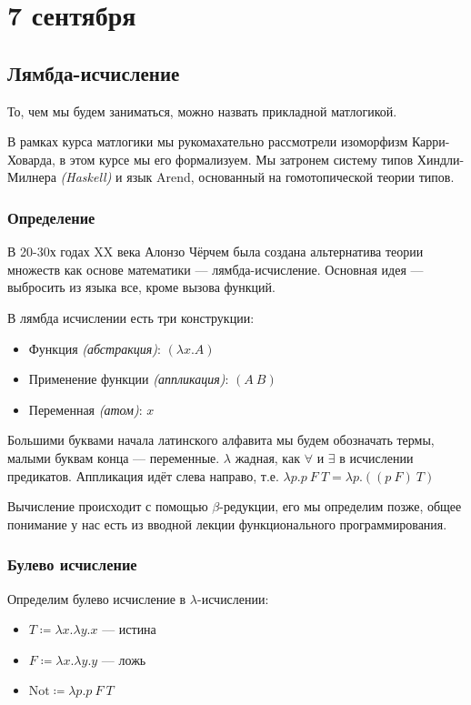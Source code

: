 \chapter{7 сентября}

\section{Лямбда-исчисление}

То, чем мы будем заниматься, можно назвать прикладной матлогикой.

В рамках курса матлогики мы рукомахательно рассмотрели изоморфизм Карри-Ховарда, в этом курсе мы его формализуем. Мы затронем систему типов Хиндли-Милнера \textit{(Haskell)} и язык Arend, основанный на гомотопической теории типов.

\subsection{Определение}

В 20-30х годах XX века Алонзо Чёрчем была создана альтернатива теории множеств как основе математики --- лямбда-исчисление. Основная идея --- выбросить из языка все, кроме вызова функций.

В лямбда исчислении есть три конструкции:
\begin{itemize}
    \item Функция \textit{(абстракция)}: \((\lambda x.A)\)
    \item Применение функции \textit{(аппликация)}: \((A\ B)\)
    \item Переменная \textit{(атом)}: \(x\)
\end{itemize}

Большими буквами начала латинского алфавита мы будем обозначать термы, малыми буквам конца --- переменные. \(\lambda\) жадная, как \(\forall\) и \(\exists\) в исчислении предикатов. Аппликация идёт слева направо, т.е. \(\lambda p.p\ F\ T = \lambda p.((p\ F)\ T)\)

Вычисление происходит с помощью \(\beta\)-редукции, его мы определим позже, общее понимание у нас есть из вводной лекции функционального программирования.

\subsection{Булево исчисление}

Определим булево исчисление в \(\lambda\)-исчислении:
\begin{itemize}
    \item \(T \coloneqq \lambda x.\lambda y.x\) --- истина
    \item \(F \coloneqq \lambda x.\lambda y.y\) --- ложь
    \item \(\mathrm{Not} \coloneqq \lambda p.p\ F\ T\)
\end{itemize}

